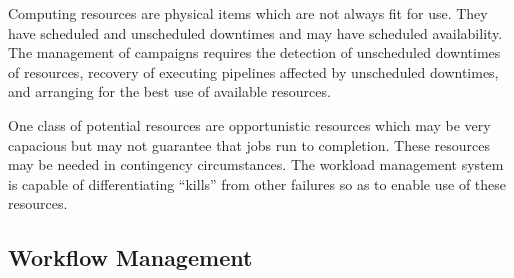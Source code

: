 \documentclass[DM,lsstdraft,toc]{lsstdoc}
\begin{document}
Computing resources are physical items which are not always fit for use. They
have scheduled and unscheduled downtimes and may have scheduled availability.
The management of campaigns requires the detection of unscheduled downtimes of
resources, recovery of executing pipelines affected by unscheduled downtimes,
and arranging for the best use of available resources. 
 
One class of potential resources are opportunistic resources which may be very
capacious but may not guarantee that jobs run to completion. These resources
may be needed in contingency circumstances. The workload management system is
capable of differentiating ``kills'' from other failures so as to enable use of
these resources. 

\subsection{Workflow Management}\label{workflow-management}
\end{document}
